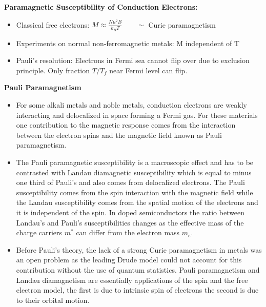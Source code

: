\textbf{Paramagnetic Susceptibility of Conduction Electrons:}
\begin{itemize}
    \item Classical free electrons: $M \approx \frac{N \mu^2 B}{k_B T} \qquad \sim$ Curie paramagnetism
    
    \item Experiments on normal non-ferromagnetic metals: M independent of T
    
    \item Pauli's resolution: Electrons in Fermi sea cannot flip over due to exclusion principle. Only fraction $T/T_f$ near Fermi level can flip.
\end{itemize}

\textbf{Pauli Paramagnetism}
\begin{itemize}
    \item For some alkali metals and noble metals, conduction electrons are weakly interacting and delocalized in space forming a Fermi gas. For these materials one contribution to the magnetic response comes from the interaction between the electron spins and the magnetic field known as Pauli paramagnetism. 
    \item The Pauli paramagnetic susceptibility is a macroscopic effect and has to be contrasted with Landau diamagnetic susceptibility which is equal to minus one third of Pauli's and also comes from delocalized electrons. The Pauli susceptibility comes from the spin interaction with the magnetic field while the Landau susceptibility comes from the spatial motion of the electrons and it is independent of the spin. In doped semiconductors the ratio between Landau's and Pauli's susceptibilities changes as the effective mass of the charge carriers $m^{*}$ can differ from the electron mass $m_{e}$.
    
    \item Before Pauli's theory, the lack of a strong Curie paramagnetism in metals was an open problem as the leading Drude model could not account for this contribution without the use of quantum statistics. Pauli paramagnetism and Landau diamagnetism are essentially applications of the spin and the free electron model, the first is due to intrinsic spin of electrons the second is due to their orbital motion.
\end{itemize}

